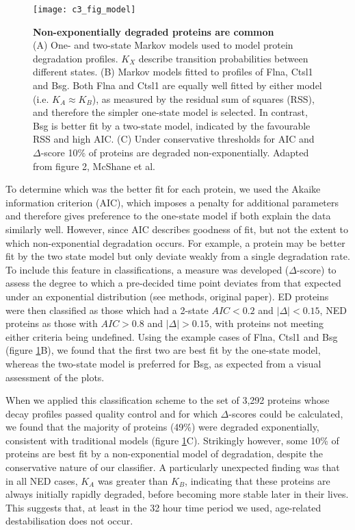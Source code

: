 \documentclass[a4paper,11pt,twoside,openright]{scrbook}
\begin{document}
\begin{figure}[h]
    \texttt{[image: c3\_fig\_model]}
    \caption[Non-exponentially degraded proteins are common]{\sffamily \textbf{Non-exponentially degraded proteins are common} \\ \small (A) One- and two-state Markov models used to model protein degradation profiles. $K_{X}$ describe transition probabilities between different states. (B) Markov models fitted to profiles of Flna, Ctsl1 and Bsg. Both Flna and Ctsl1 are equally well fitted by either model (i.e. $K_{A} \approx K_{B}$), as measured by the residual sum of squares (RSS), and therefore the simpler one-state model is selected. In contrast, Bsg is better fit by a two-state model, indicated by the favourable RSS and high AIC. (C) Under conservative thresholds for AIC and $\Delta$-score 10\% of proteins are degraded non-exponentially. Adapted from figure 2, McShane et al.\cite{McShane2016}}
    \label{figure:model}
\end{figure}

To determine which was the better fit for each protein, we used the Akaike information criterion \cite{Akaike1974} (AIC), which imposes a penalty for additional parameters and therefore gives preference to the one-state model if both explain the data similarly well. However, since AIC describes goodness of fit, but not the extent to which non-exponential degradation occurs. For example, a protein may be better fit by the two state model but only deviate weakly from a single degradation rate. To include this feature in classifications, a measure was developed ($\Delta$-score) to assess the degree to which a pre-decided time point deviates from that expected under an exponential distribution (see methods, original paper). ED proteins were then classified as those which had a 2-state $AIC < 0.2$ and $\lvert \Delta \rvert < 0.15$, NED proteins as those with $AIC > 0.8$ and $\lvert \Delta \rvert > 0.15$, with proteins not meeting either criteria being undefined. Using the example cases of Flna, Ctsl1 and Bsg (figure \ref{figure:model}B), we found that the first two are best fit by the one-state model, whereas the two-state model is preferred for Bsg, as expected from a visual assessment of the plots.

When we applied this classification scheme to the set of 3,292 proteins whose decay profiles passed quality control and for which $\Delta$-scores could be calculated, we found that the majority of proteins (49\%) were degraded exponentially, consistent with traditional models (figure \ref{figure:model}C). Strikingly however, some 10\% of proteins are best fit by a non-exponential model of degradation, despite the conservative nature of our classifier. A particularly unexpected finding was that in all NED cases, $K_{A}$ was greater than $K_{B}$, indicating that these proteins are always initially rapidly degraded, before becoming more stable later in their lives. This suggests that, at least in the 32 hour time period we used, age-related destabilisation does not occur.
\end{document}

